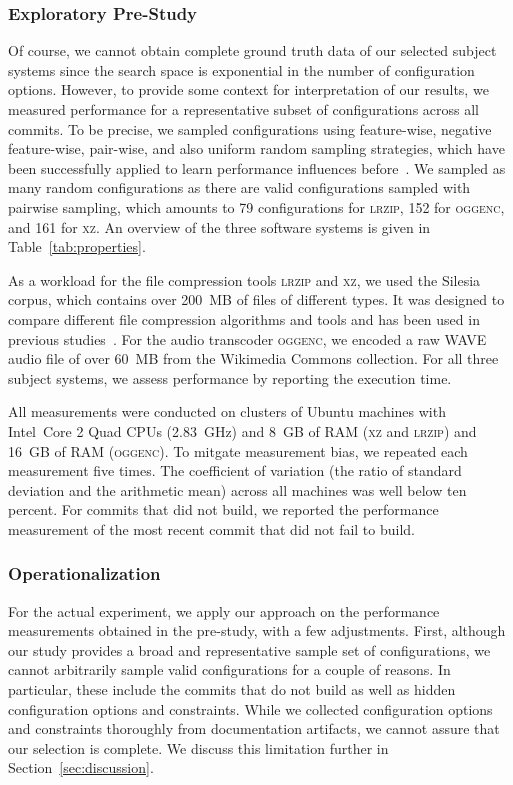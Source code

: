 \documentclass[sigconf, screen]{acmart}
\begin{document}
	\subsubsection{Exploratory Pre-Study}
	Of course, we cannot obtain complete ground truth data of our selected subject systems since the search space is exponential in the number of configuration options. 
	However, to provide some context for interpretation of our results, we measured performance for a representative subset of configurations across all commits. To be precise, we sampled configurations using feature-wise, negative feature-wise, pair-wise, and also uniform random sampling strategies, which have been successfully applied to learn performance influences before~\cite{alves_sampling_2020}. We sampled as many random configurations as there are valid configurations sampled with pairwise sampling, which amounts to 79 configurations for \textsc{lrzip}, 152 for \textsc{oggenc}, and 161 for \textsc{xz}. An overview of the three software systems is given in Table~\ref{tab:properties}.
	
	As a workload for the file compression tools \textsc{lrzip} and \textsc{xz}, we used the Silesia corpus, which contains over 200~MB of files of different types. It was designed to compare different file compression algorithms and tools and has been used in previous studies~\cite{muhlbauer_accurate_2019}. For the audio transcoder \textsc{oggenc}, we encoded a raw WAVE audio file of over 60~MB from the Wikimedia Commons collection. For all three subject systems, we assess performance by reporting the execution time.
	
	All measurements were conducted on clusters of Ubuntu machines with Intel~Core
	2 Quad CPUs (2.83~GHz) and 8~GB of RAM (\textsc{xz} and \textsc{lrzip}) and 16~GB of RAM (\textsc{oggenc}). To mitgate measurement bias, we repeated each measurement five times. The coefficient of variation (the ratio of standard deviation and the arithmetic mean) across all machines was well below ten percent. For commits that did not build, we reported the performance measurement of the most recent commit that did not fail to build.
	
	\subsubsection{Operationalization}\label{sec:rq2_operationalization}
	For the actual experiment, we apply our approach on the performance measurements obtained in the pre-study, with a few adjustments.
	First, although our study provides a broad and representative sample set of configurations, we cannot arbitrarily sample valid configurations for a couple of reasons. In particular, these include the commits that do not build as well as hidden configuration options and constraints. While we collected configuration options and constraints thoroughly from documentation artifacts, we cannot assure that our selection is complete. We discuss this limitation further in Section~\ref{sec:discussion}.
	
\end{document}
